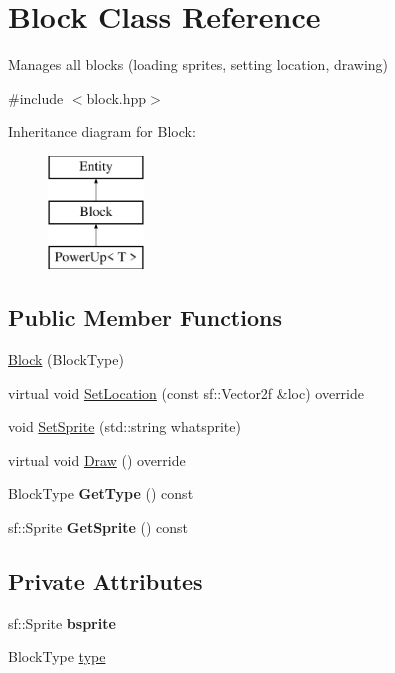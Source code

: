 \hypertarget{class_block}{}\section{Block Class Reference}
\label{class_block}


Manages all blocks (loading sprites, setting location, drawing)  




{\ttfamily \#include $<$block.\+hpp$>$}

Inheritance diagram for Block\+:\begin{figure}[H]
\begin{center}
\leavevmode
\includegraphics[height=3.000000cm]{class_block}
\end{center}
\end{figure}
\subsection*{Public Member Functions}
\begin{DoxyCompactItemize}
\item 
\mbox{\hyperlink{class_block_ad5589c616b24a615a8eb3ca11c2faa75}{Block}} (Block\+Type)
\item 
virtual void \mbox{\hyperlink{class_block_a81095040d17d80f7cb3e7a67f4b2cea2}{Set\+Location}} (const sf\+::\+Vector2f \&loc) override
\item 
void \mbox{\hyperlink{class_block_ad6973b0ed9500d24a169434a4d0a3c23}{Set\+Sprite}} (std\+::string whatsprite)
\item 
virtual void \mbox{\hyperlink{class_block_a6d49bcccea386310e034cddb0bab4620}{Draw}} () override
\item 
\mbox{\label{class_block_ab079a53b3291d9aae89181c7ef754343}} 
Block\+Type {\bfseries Get\+Type} () const
\item 
\mbox{\label{class_block_a4e5a546dfa29c1c20bbfbf98f5496ada}} 
sf\+::\+Sprite {\bfseries Get\+Sprite} () const
\end{DoxyCompactItemize}
\subsection*{Private Attributes}
\begin{DoxyCompactItemize}
\item 
\mbox{\label{class_block_a8626d22d09a307748bccb295bc45509d}} 
sf\+::\+Sprite {\bfseries bsprite}
\item 
Block\+Type \mbox{\hyperlink{class_block_a5a9ca25a0a1e718944de014be72554cc}{type}}
\end{DoxyCompactItemize}
